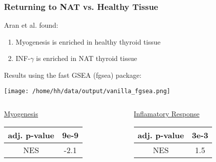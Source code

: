 \documentclass[11pt,t]{beamer}
\begin{document}
\begin{frame}
  \frametitle{Returning to NAT vs. Healthy Tissue}

  Aran et al. found:
  \begin{enumerate}
    \item Myogenesis is enriched in healthy thyroid tissue
    \item INF-\(\gamma\) is enriched in NAT thyroid tissue
  \end{enumerate}
  
  Results using the fast GSEA (fgsea) package:
  \begin{center}
    \texttt{[image: /home/hh/data/output/vanilla\_fgsea.png]}
  \end{center}
  \begin{columns}
    \begin{column}{0.5\textwidth}
      \begin{center}
        \underline{Myogenesis}
        
        \begin{tabular}{ |c|c| } 
        \hline
        adj. p-value & \textbf{9e-9} \\
        \hline
        NES & -2.1 \\
        \hline
        \end{tabular}
      \end{center}
    \end{column}
    \vrule{}
    \begin{column}{0.5\textwidth}  %
      \begin{center}
        \underline{Inflamatory Response}
        
        \begin{tabular}{ |c|c| } 
        \hline
        adj. p-value & \textbf{3e-3} \\
        \hline
        NES & 1.5 \\
        \hline
        \end{tabular}
      \end{center}
    \end{column}
   \end{columns}
\end{frame}
\end{document}
